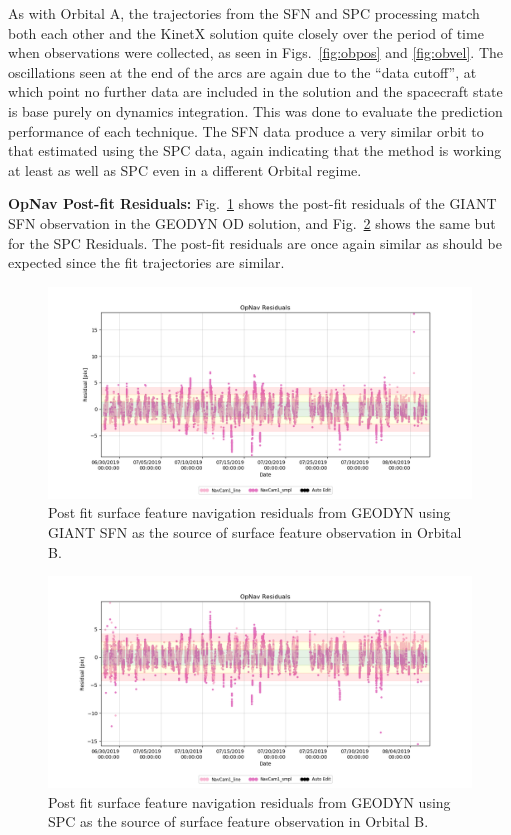 \documentclass{src/RPI-SIW}
\begin{document}
As with Orbital A, the trajectories from the SFN and SPC processing match both each other and the KinetX solution quite closely over the period of time when observations were collected, as seen in Figs.~\ref{fig:obpos} and \ref{fig:obvel}.  The oscillations seen at the end of the arcs are again due to the ``data cutoff'', at which point no further data are included in the solution and the spacecraft state is base purely on dynamics integration.  This was done to evaluate the prediction performance of each technique.  The SFN data produce a very similar orbit to that estimated using the SPC data, again indicating that the method is working at least as well as SPC even in a different Orbital regime.

\textbf{OpNav Post-fit Residuals:}
Fig.~\ref{fig:obsfn} shows the post-fit residuals of the GIANT SFN observation in the GEODYN OD solution, and Fig.~\ref{fig:obspc} shows the same but for the SPC Residuals.  The post-fit residuals are once again similar as should be expected since the fit trajectories are similar.
\begin{figure}[htbp]
	\centering
	\includegraphics[width=\columnwidth]{orbitb_sfn.png}
    \caption{Post fit surface feature navigation residuals from GEODYN using GIANT SFN as the source of surface feature observation in Orbital B.}
    \label{fig:obsfn}
\end{figure}
\begin{figure}[htbp]
	\centering
	\includegraphics[width=\columnwidth]{orbitb_spc.png}
    \caption{Post fit surface feature navigation residuals from GEODYN using SPC as the source of surface feature observation in Orbital B.}
    \label{fig:obspc}
\end{figure}
\end{document}
